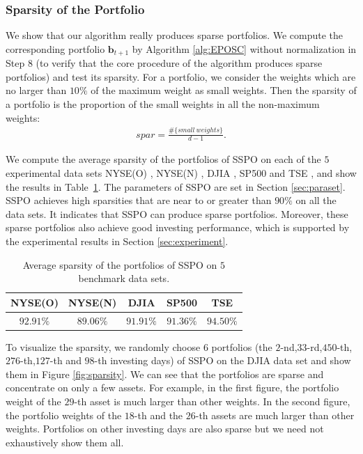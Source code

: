 \documentclass[twoside,11pt]{article}
\begin{document}
\subsubsection{Sparsity of the Portfolio}
\label{sec:sparsity}
We show that our algorithm really produces sparse portfolios. We compute the corresponding portfolio $\mathbf{b}_{t+1}$ by Algorithm \ref{alg:EPOSC} without normalization in Step 8 (to verify that the core procedure of the algorithm produces sparse portfolios) and test its sparsity. For a portfolio, we consider the weights which are no larger than $10\%$ of the maximum weight as small weights. Then the sparsity of a portfolio is the proportion of the small weights in all the non-maximum weights:
\begin{eqnarray}
\label{eqn:sparsity}
spar=\frac{\#\{small\:weights\}}{d-1}.
\end{eqnarray}

We compute the average sparsity of the portfolios of SSPO on each of the $5$ experimental data sets NYSE(O) \citep{uPS1}, NYSE(N) \citep{CWMR}, DJIA \citep{anticor}, SP500 \citep{anticor} and TSE \citep{anticor}, and show the results in Table~\ref{tab:sparsity}. The parameters of SSPO are set in Section \ref{sec:paraset}. SSPO achieves high sparsities that are near to or greater than $90\%$ on all the data sets. It indicates that SSPO can produce sparse portfolios. Moreover, these sparse portfolios also achieve good investing performance, which is supported by the experimental results in Section \ref{sec:experiment}.


\begin{table}[!htb]

\centering
\small
\begin{tabular}{|c|c|c|c|c|}
\hline
 {NYSE(O)}  & {NYSE(N)}  &{DJIA}  & {SP500}  &  {TSE}   \\
 \hline
 $92.91\%$    & $89.06\%$   &  $91.91\%$   &  $91.36\%$  & $94.50\%$   \\
  \hline
\end{tabular}
\normalsize
\caption{Average sparsity of the portfolios of SSPO on $5$ benchmark data sets.}
\label{tab:sparsity}
\end{table}


To visualize the sparsity, we randomly choose $6$ portfolios (the $2$-nd,$33$-rd,$450$-th,$276$-th,$127$-th and $98$-th investing days) of SSPO on the DJIA data set and show them in Figure \ref{fig:sparsity}. We can see that the portfolios are sparse and concentrate on only a few assets. For example, in the first figure, the portfolio weight of the $29$-th asset is much larger than other weights. In the second figure, the portfolio weights of the $18$-th and the $26$-th assets are much larger than other weights. Portfolios on other investing days are also sparse but we need not exhaustively show them all. 
\end{document}
